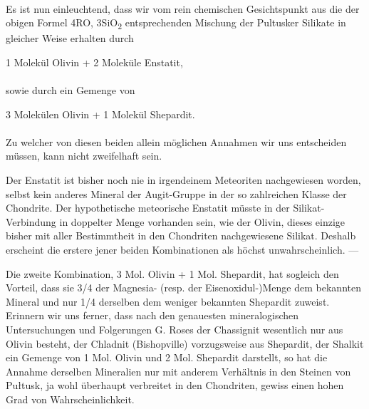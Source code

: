 \documentclass[a4paper, 11pt, oneside, german]{article}
\begin{document}
\paragraph{}
Es ist nun einleuchtend, dass wir vom rein chemischen Gesichtspunkt aus die der obigen Formel 4RO, 3SiO\textsubscript{2} entsprechenden Mischung der Pultusker Silikate in gleicher Weise erhalten durch
\begin{center}
1 Molekül Olivin + 2 Moleküle Enstatit,
\end{center}
\paragraph{}
sowie durch ein Gemenge von
\begin{center}
3 Molekülen Olivin + 1 Molekül Shepardit.
\end{center}
\paragraph{}
Zu welcher von diesen beiden allein möglichen Annahmen wir uns entscheiden müssen, kann nicht zweifelhaft sein.

Der Enstatit ist bisher noch nie in irgendeinem Meteoriten nachgewiesen worden, selbst kein anderes Mineral der Augit-Gruppe in der so zahlreichen Klasse der Chondrite. Der hypothetische meteorische Enstatit müsste in der Silikat-Verbindung in doppelter Menge vorhanden sein, wie der Olivin, dieses einzige bisher mit aller Bestimmtheit in den Chondriten nachgewiesene Silikat. Deshalb erscheint die erstere jener beiden Kombinationen als höchst unwahrscheinlich. ---

Die zweite Kombination, 3 Mol. Olivin + 1 Mol. Shepardit, hat sogleich den Vorteil, dass sie 3/4 der Magnesia- (resp. der Eisenoxidul-)Menge dem bekannten Mineral und nur 1/4 derselben dem weniger bekannten Shepardit zuweist. Erinnern wir uns ferner, dass nach den genauesten mineralogischen Untersuchungen und Folgerungen G. Roses der Chassignit wesentlich nur aus Olivin besteht, der Chladnit (Bishopville) vorzugsweise aus Shepardit, der Shalkit ein Gemenge von 1 Mol. Olivin und 2 Mol. Shepardit darstellt, so hat die Annahme derselben Mineralien nur mit anderem Verhältnis in den Steinen von Pułtusk, ja wohl überhaupt verbreitet in den Chondriten, gewiss einen hohen Grad von Wahrscheinlichkeit.
\end{document}
